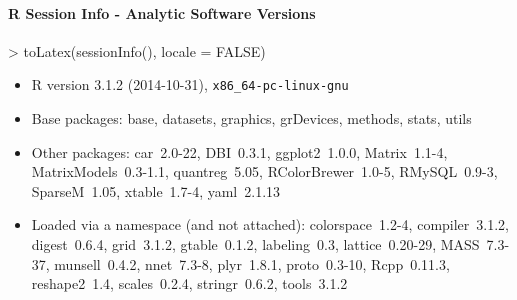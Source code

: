 \documentclass[a4paper]{report}
\begin{document}
\begin{Schunk}
\end{Schunk}


\paragraph{R Session Info - Analytic Software Versions }
\begin{Schunk}
\begin{Sinput}
> toLatex(sessionInfo(), locale = FALSE)
\end{Sinput}
\begin{itemize}\raggedright
  \item R version 3.1.2 (2014-10-31), \verb|x86_64-pc-linux-gnu|
  \item Base packages: base, datasets, graphics, grDevices, methods,
    stats, utils
  \item Other packages: car~2.0-22, DBI~0.3.1, ggplot2~1.0.0,
    Matrix~1.1-4, MatrixModels~0.3-1.1, quantreg~5.05,
    RColorBrewer~1.0-5, RMySQL~0.9-3, SparseM~1.05, xtable~1.7-4,
    yaml~2.1.13
  \item Loaded via a namespace (and not attached): colorspace~1.2-4,
    compiler~3.1.2, digest~0.6.4, grid~3.1.2, gtable~0.1.2,
    labeling~0.3, lattice~0.20-29, MASS~7.3-37, munsell~0.4.2,
    nnet~7.3-8, plyr~1.8.1, proto~0.3-10, Rcpp~0.11.3, reshape2~1.4,
    scales~0.2.4, stringr~0.6.2, tools~3.1.2
\end{itemize}\end{Schunk}
\end{document}
